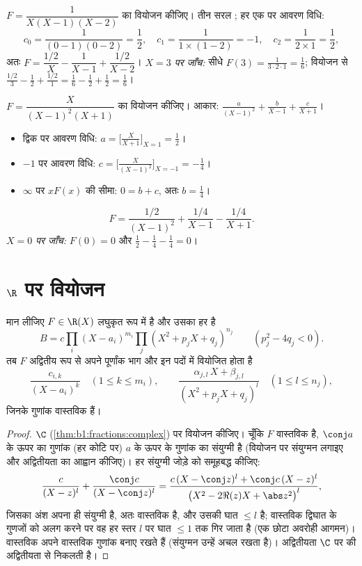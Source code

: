 \begin{example}\label{ex:b1:fractions:simple}
$F = \dfrac{1}{X(X-1)(X-2)}$ का वियोजन कीजिए। तीन सरल ; हर एक पर आवरण
विधि:
\[
c_0 = \frac{1}{(0-1)(0-2)} = \frac12,
\quad
c_1 = \frac{1}{1 \times (1 - 2)} = -1,
\quad
c_2 = \frac{1}{2 \times 1} = \frac12,
\]
अतः $F = \dfrac{1/2}{X} - \dfrac{1}{X-1} + \dfrac{1/2}{X-2}$। \emph{$X = 3$
पर जाँच:} सीधे $F(3) = \frac{1}{3\cdot2\cdot1} = \frac16$; वियोजन से
$\frac{1/2}{3} - \frac{1}{2} + \frac{1/2}{1} = \frac16 - \frac12 + \frac12 =
\frac16$।
\end{example}

\begin{example}[बहु ध्रुव]\label{ex:b1:fractions:multiple}
$F = \dfrac{X}{(X-1)^2 (X+1)}$ का वियोजन कीजिए। आकार: $\frac{a}{(X-1)^2} +
\frac{b}{X-1} + \frac{c}{X+1}$।
\begin{itemize}
  \item द्विक  पर आवरण विधि: $a = \bigl[\frac{X}{X+1}\bigr]_{X=1} =
  \frac12$।
  \item $-1$ पर आवरण विधि: $c = \bigl[\frac{X}{(X-1)^2}\bigr]_{X=-1} =
  -\frac14$।
  \item $\infty$ पर $xF(x)$ की सीमा: $0 = b + c$, अतः $b = \frac14$।
\end{itemize}
\[
F = \frac{1/2}{(X-1)^2} + \frac{1/4}{X-1} - \frac{1/4}{X+1} .
\]
\emph{$X = 0$ पर जाँच:} $F(0) = 0$ और $\frac12 - \frac14 - \frac14 = 0$।
\end{example}

\section{$\R$ पर वियोजन}

\begin{theorem}[$\R$ पर वियोजन]\label{thm:b1:fractions:real}
मान लीजिए $F \in \R(X)$ लघुकृत रूप में है और उसका हर है
\[
B = c \prod_i (X - a_i)^{m_i} \prod_j (X^2 + p_j X + q_j)^{n_j}
\qquad (p_j^2 - 4q_j < 0).
\]
तब $F$ अद्वितीय रूप से अपने पूर्णांक भाग और इन पदों में वियोजित होता है
\[
\frac{c_{i,k}}{(X - a_i)^k} \quad (1 \leq k \leq m_i),
\qquad
\frac{\alpha_{j,l}\, X + \beta_{j,l}}{(X^2 + p_j X + q_j)^{l}}
\quad (1 \leq l \leq n_j),
\]
जिनके गुणांक वास्तविक हैं।
\end{theorem}

\begin{proof}
$\C$ (\cref{thm:b1:fractions:complex}) पर वियोजन कीजिए। चूँकि $F$ वास्तविक
है,  $\conj a$ के ऊपर का गुणांक (हर कोटि पर) $a$ के ऊपर के गुणांक का
संयुग्मी है (वियोजन पर संयुग्मन लगाइए और अद्वितीयता का आह्वान कीजिए)। हर
संयुग्मी जोड़े को समूहबद्ध कीजिए:
\[
\frac{c}{(X - z)^l} + \frac{\conj c}{(X - \conj z)^l}
= \frac{c\,(X - \conj z)^l + \conj c\,(X - z)^l}{\bigl(X^2 - 2\Re(z)X
+ \abs z^2\bigr)^{l}},
\]
जिसका अंश अपना ही संयुग्मी है, अतः वास्तविक है, और उसकी घात $\leq l$ है;
वास्तविक द्विघात के गुणजों को अलग करने पर वह हर स्तर $l$ पर घात $\leq 1$ तक
गिर जाता है (एक छोटा अवरोही आगमन)। वास्तविक  अपने वास्तविक गुणांक बनाए
रखते हैं (संयुग्मन उन्हें अचल रखता है)। अद्वितीयता $\C$ पर की अद्वितीयता से
निकलती है।
\end{proof}

